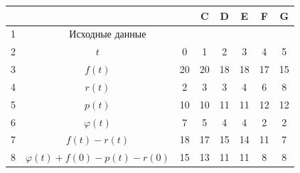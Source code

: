   \begin{figure} %


  {\small \begin{center}


  \begin{tabular}{|c|c|c|c|c|c|c|c|}


  \hline


\cellcolor[gray]{.9}  &\cellcolor[gray]{.9}{А}&\cellcolor[gray]{.9}{B}&\cellcolor[gray]{.9}C&\cellcolor[gray]{.9}D&


  \cellcolor[gray]{.9}E&\cellcolor[gray]{.9}F&\cellcolor[gray]{.9}G\\


\hline


\cellcolor[gray]{.9}1&\multicolumn{2}{c|}{Исходные данные}&&&&&\\


\hline


\cellcolor[gray]{.9}2&$t$&0&\hphantom{9}1&\hphantom{9}2&\hphantom{9}3&\hphantom{9}4&\hphantom{9}5\\


\cellcolor[gray]{.9}3&$f(t)$&20&20&18&\hphantom{9}18&17&15\\


\cellcolor[gray]{.9}4&$r(t)$&2&\hphantom{9}3&\hphantom{9}3&\hphantom{9}4&\hphantom{9}6&\hphantom{9}8\\


\cellcolor[gray]{.9}5&$p(t)$&10&10&11&11&12&12\\


\cellcolor[gray]{.9}6&$\varphi (t)$&\hphantom{9}7&\hphantom{9}5&\hphantom{9}4&\hphantom{9}4&\hphantom{9}2&\hphantom{9}2\\


\cellcolor[gray]{.9}7&$f(t) - r(t)$&18&17&15&14&11&\hphantom{9}7\\


\cellcolor[gray]{.9}8&$\varphi (t) + f(0) - p(t) - r(0)$&15&13&11&11&\hphantom{9}8&\hphantom{9}8\\


\hline


\end{tabular}


\end{center}}


\vspace*{-6pt}




  \vspace*{-12pt}


  \end{figure}


